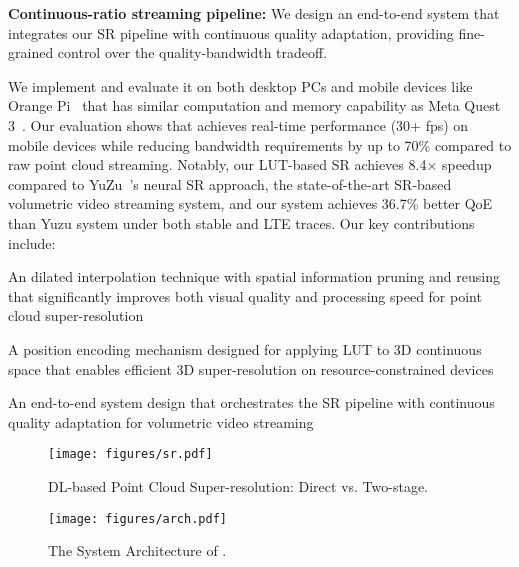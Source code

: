 \BULLET \textbf{Continuous-ratio streaming pipeline:} We design an end-to-end system that integrates our SR pipeline with continuous quality adaptation, providing fine-grained control over the quality-bandwidth tradeoff. 

We implement \name and evaluate it on both desktop PCs and mobile devices like Orange Pi~\cite{orangepi_5b} that has similar computation and memory capability as Meta Quest 3~\cite{meta_quest_compare}. Our evaluation shows that \name achieves real-time performance (30+ fps) on mobile devices while reducing bandwidth requirements by up to 70\% compared to raw point cloud streaming. Notably, our LUT-based SR achieves 8.4$\times$ speedup compared to YuZu~\cite{zhang_yuzu_nodate}'s neural SR  approach, the state-of-the-art SR-based volumetric video streaming system, and our system achieves 36.7\% better QoE than Yuzu system under both stable and LTE traces.
Our key contributions include:

\BULLET An dilated interpolation technique  with spatial information pruning and reusing that significantly improves both visual quality and processing speed for point cloud super-resolution

\BULLET A position encoding mechanism designed for applying LUT to 3D continuous space that enables efficient 3D super-resolution on resource-constrained devices

\BULLET An end-to-end system design that orchestrates the SR pipeline with continuous quality adaptation for volumetric video streaming



\begin{figure*}[ht]
    \centering
    \begin{minipage}{0.38\textwidth}
        \centering
        \texttt{[image: figures/sr.pdf]} %
        \caption{DL-based Point Cloud Super-resolution: Direct vs. Two-stage.}
        \label{fig:SR}
    \end{minipage}\hfill
    \begin{minipage}{0.6\textwidth}
        \centering
        \texttt{[image: figures/arch.pdf]}
        \vspace{-.1in}
    \caption{ The System Architecture of \name.}
    \vspace{-.3in}
    \label{fig:arch}
    \end{minipage}
\end{figure*}
